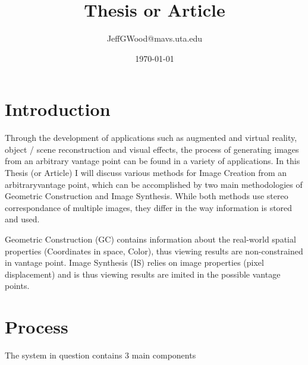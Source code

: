 \documentclass[a4paper,10pt]{article}
\title{Thesis or Article}
\author{JeffGWood@mavs.uta.edu}
\date{\today}
\begin{document}
\maketitle
\newpage
\tableofcontents
\newpage


\normalsize
\section{Introduction}
\par Through the development of applications such as augmented and virtual reality, object / scene reconstruction and visual effects, the process of generating images from an arbitrary vantage point can be found in a variety of applications. In this Thesis (or Article) I will discuss various methods for Image Creation from an arbitraryvantage point, which can be accomplished by two main methodologies of Geometric Construction and Image Synthesis. While both methods use stereo correspondance of multiple images, they differ in the way information is stored and used.
\par Geometric Construction (GC) contains information about the real-world spatial properties (Coordinates in space, Color), thus viewing results are non-constrained in vantage point. Image Synthesis (IS) relies on image properties (pixel displacement) and is thus viewing results are imited in the possible vantage points.
\section{Process}
The system in question contains 3 main components

\begin{equation*}
\end{equation*}


%
\end{document}
